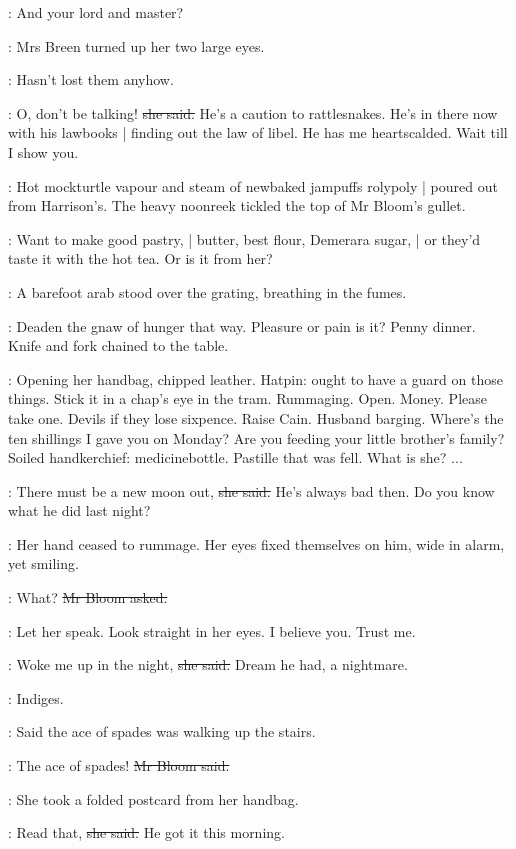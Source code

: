 \Bloom:
And your lord and master?

:
Mrs Breen turned up her two large eyes.

\BloomInt:
Hasn't lost them anyhow.

\josie:
O, don't be talking!
\sout{she said.}
He's a caution to rattlesnakes.
He's in there now with his lawbooks |
finding out the law of libel.
He has me heartscalded.
Wait till I show you.

:
Hot mockturtle vapour and steam of newbaked jampuffs rolypoly |
poured out from Harrison's.
The heavy noonreek tickled the top of Mr Bloom's gullet.

\BloomInt:
Want to make good pastry, |
butter, best flour, Demerara sugar, |
or they'd taste it with the hot tea.
Or is it from her?

:
A barefoot arab stood over the grating,
breathing in the fumes.

\BloomInt:
Deaden the gnaw of hunger that way.
Pleasure or pain is it?
Penny dinner.
Knife and fork
chained to the table.

\BloomInt:
Opening her handbag, chipped leather.
Hatpin:
ought to have a guard on those things.
Stick it in a chap's eye in the tram.
Rummaging.
Open.
Money.
Please take one.
Devils if they lose sixpence.
Raise Cain.
Husband barging.
Where's the ten shillings I gave you on Monday?
Are you feeding your little brother's family?
Soiled handkerchief:
medicinebottle.
Pastille that was fell.
What is she?
...

\josie:
There must be a new moon out,
\sout{she said.}
He's always bad then.
Do you know what he did last night?

:
Her hand ceased to rummage.
Her eyes fixed themselves on him,
wide in alarm,
yet smiling.

\Bloom:
What?
\sout{Mr Bloom asked.}

\BloomInt:
Let her speak.
Look straight in her eyes.
I believe you.
Trust me.

\josie:
Woke me up in the night,
\sout{she said.}
Dream he had,
a nightmare.

\BloomInt:
Indiges.

\josie:
Said the ace of spades was walking up the stairs.

\Bloom:
The ace of spades!
\sout{Mr Bloom said.}

:
She took a folded postcard from her handbag.

\josie:
Read that,
\sout{she said.}
He got it this morning.

